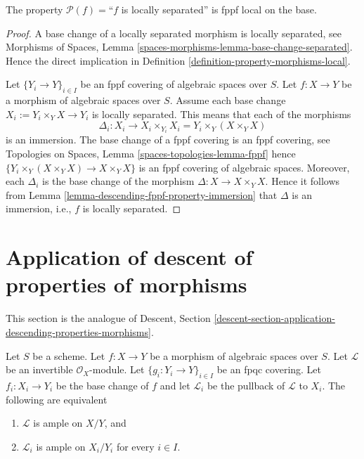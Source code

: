 \begin{lemma}
\label{lemma-descending-fppf-property-locally-separated}
The property $\mathcal{P}(f) =$``$f$ is locally separated''
is fppf local on the base.
\end{lemma}

\begin{proof}
A base change of a locally separated morphism is locally separated, see
Morphisms of Spaces,
Lemma \ref{spaces-morphisms-lemma-base-change-separated}.
Hence the direct implication in
Definition \ref{definition-property-morphisms-local}.

\medskip\noindent
Let $\{Y_i \to Y\}_{i \in I}$ be an fppf covering of algebraic spaces over $S$.
Let $f : X \to Y$ be a morphism of algebraic spaces over $S$.
Assume each base change $X_i := Y_i \times_Y X \to Y_i$ is locally separated.
This means that each of the morphisms
$$
\Delta_i :
X_i
\longrightarrow
X_i \times_{Y_i} X_i = Y_i \times_Y (X \times_Y X)
$$
is an immersion. The base change of a fppf covering is an
fppf covering, see
Topologies on Spaces, Lemma \ref{spaces-topologies-lemma-fppf}
hence $\{Y_i \times_Y (X \times_Y X) \to X \times_Y X\}$
is an fppf covering of algebraic spaces. Moreover, each
$\Delta_i$ is the base change of the morphism
$\Delta : X \to X \times_Y X$. Hence it follows from
Lemma \ref{lemma-descending-fppf-property-immersion}
that $\Delta$ is an immersion, i.e., $f$ is locally separated.
\end{proof}





\section{Application of descent of properties of morphisms}
\label{section-application-descending-properties-morphisms}

\noindent
This section is the analogue of Descent, Section
\ref{descent-section-application-descending-properties-morphisms}.

\begin{lemma}
\label{lemma-descending-property-ample}
Let $S$ be a scheme.
Let $f : X \to Y$ be a morphism of algebraic spaces over $S$.
Let $\mathcal{L}$ be an invertible $\mathcal{O}_X$-module.
Let $\{g_i : Y_i \to Y\}_{i \in I}$ be an fpqc covering.
Let $f_i : X_i \to Y_i$ be the base change of $f$ and let $\mathcal{L}_i$
be the pullback of $\mathcal{L}$ to $X_i$.
The following are equivalent
\begin{enumerate}
\item $\mathcal{L}$ is ample on $X/Y$, and
\item $\mathcal{L}_i$ is ample on $X_i/Y_i$
for every $i \in I$.
\end{enumerate}
\end{lemma}

